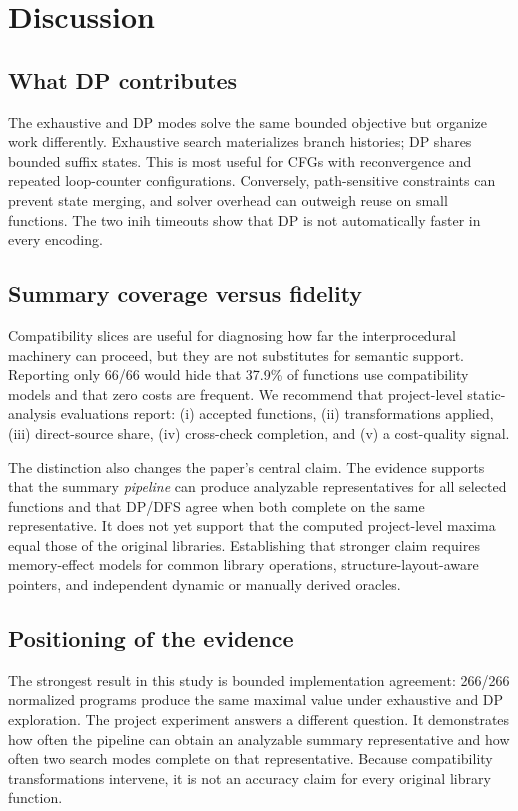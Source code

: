 \documentclass[10pt,conference]{IEEEtran}
\begin{document}
\section{Discussion}
\subsection{What DP contributes}
The exhaustive and DP modes solve the same bounded objective but organize work differently. Exhaustive search materializes branch histories; DP shares bounded suffix states. This is most useful for CFGs with reconvergence and repeated loop-counter configurations. Conversely, path-sensitive constraints can prevent state merging, and solver overhead can outweigh reuse on small functions. The two inih timeouts show that DP is not automatically faster in every encoding.

\subsection{Summary coverage versus fidelity}
Compatibility slices are useful for diagnosing how far the interprocedural machinery can proceed, but they are not substitutes for semantic support. Reporting only 66/66 would hide that 37.9\% of functions use compatibility models and that zero costs are frequent. We recommend that project-level static-analysis evaluations report: (i) accepted functions, (ii) transformations applied, (iii) direct-source share, (iv) cross-check completion, and (v) a cost-quality signal.

The distinction also changes the paper's central claim. The evidence supports that the summary \emph{pipeline} can produce analyzable representatives for all selected functions and that DP/DFS agree when both complete on the same representative. It does not yet support that the computed project-level maxima equal those of the original libraries. Establishing that stronger claim requires memory-effect models for common library operations, structure-layout-aware pointers, and independent dynamic or manually derived oracles.

\subsection{Positioning of the evidence}
The strongest result in this study is bounded implementation agreement: 266/266 normalized programs produce the same maximal value under exhaustive and DP exploration. The project experiment answers a different question. It demonstrates how often the pipeline can obtain an analyzable summary representative and how often two search modes complete on that representative. Because compatibility transformations intervene, it is not an accuracy claim for every original library function.
\end{document}
